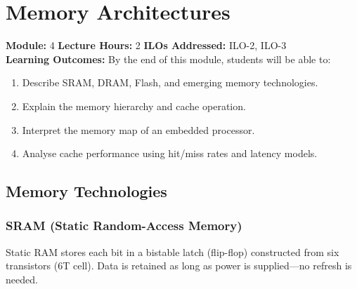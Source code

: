 
\chapter{Memory Architectures}
\label{ch:memory}

\begin{moduleinfo}
  \textbf{Module:} 4 \quad
  \textbf{Lecture Hours:} 2 \quad
  \textbf{ILOs Addressed:} ILO-2, ILO-3 \\[4pt]
  \textbf{Learning Outcomes:} By the end of this module, students will be able to:
  \begin{enumerate}[nosep]
    \item Describe SRAM, DRAM, Flash, and emerging memory technologies.
    \item Explain the memory hierarchy and cache operation.
    \item Interpret the memory map of an embedded processor.
    \item Analyse cache performance using hit/miss rates and latency models.
  \end{enumerate}
\end{moduleinfo}

\section{Memory Technologies}
\label{sec:mem:tech}

\subsection{SRAM (Static Random-Access Memory)}

\begin{definition}[SRAM]
Static RAM stores each bit in a bistable latch (flip-flop) constructed from six transistors (6T cell). Data is retained as long as power is supplied—no refresh is needed.
\end{definition}

